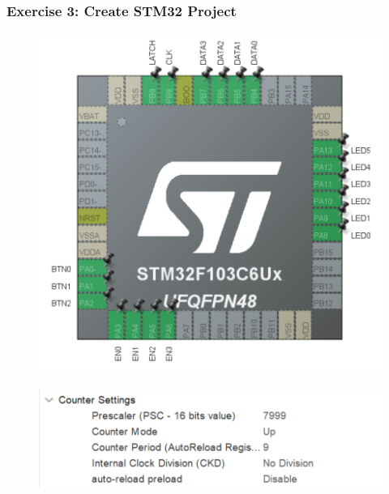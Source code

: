 \documentclass[a4paper,12pt]{article}
\begin{document}
\subsubsection{Exercise 3: Create STM32 Project}
\label{ex3r1}
\begin{figure}[H]
	\centering
	\includegraphics[width=0.95\linewidth]{Attachments/1.2.3.1.PNG}
\end{figure}
\label{ex3r2}
\begin{figure}[H]
	\centering
	\includegraphics[width=0.95\linewidth]{Attachments/1.2.3.2.PNG}
\end{figure}
\newpage
\end{document}
